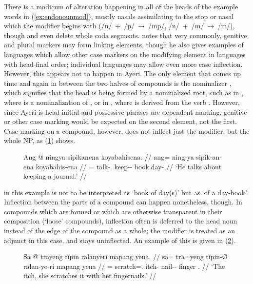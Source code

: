 There is a modicum of alteration happening in all of the heads of the example 
words in (\ref{ex:endonounmod}), mostly nasals assimilating to the stop or 
nasal which the modifier begins with (/n/~+~/p/~→~/mp/, /n/~+~/m/~→~/m/), 
though  and  even delete 
whole coda segments.
\citet[703]{bauer2001} notes that very commonly, genitive and plural markers 
may form linking elements, though he also gives examples of languages which
allow other case markers on the modifying element in languages with head-final
order; individual languages may allow even more case inflection. However, this
appears not to happen in Ayeri. The only element that comes up time and again
in between the two halves of compounds is the nominalizer ,
which signifies that the head is being formed by a nominalized root, such as in
, where  is a 
nominalization of , or in 
, where  is derived 
from the verb . However, since Ayeri is head-initial
and possessive phrases are dependent marking, genitive or other case marking
would be expected on the second element, not the first. Case marking on a
compound, however, does not inflect just the modifier, but the whole NP, as 
(\ref{ex:compinfl}) shows.

\begin{figure}[h]
\ex\label{ex:compinfl}\begingl
	\gla Ang @ ningya sipikanena koyabahisena. //
	\glb ang= ning-ya sipik-an-ena koyabahis-ena //
	\glc \AgtT{}= talk-\TsgM{}.\Top{} keep-\Nmlz{}-\Gen{} book.day-\Gen{} //
	\glft `He talks about keeping a journal.' //
\endgl\xe
\end{figure}

 in this example is not to be interpreted as 
`book of day(s)' but as `of a day-book'. Inflection between the parts of a
compound can happen nonetheless, though. In compounds which are formed  or which are otherwise transparent in their composition (`loose'
compounds\label{loosecomp}), inflection often is deferred to the head noun
instead of the edge of the compound as a whole; the modifier is treated as an
adjunct in this case, and stays uninflected. An example of this is given in 
(\ref{ex:nouncompdiv}).

\begin{figure}[h]
\ex\label{ex:nouncompdiv}\begingl
	\gla Sa @ trayeng tipin ralanyeri mapang yena. //
	\glb sa= tra=yeng tipin-Ø ralan-ye-ri mapang yena //
	\glc \PatT{}= scratch=\TsgF{}.\Aarg{} itch-\Top{} nail-\Pl{}-\Ins{} 
		finger \TsgF{}.\Gen{} //
	\glft `The itch, she scratches it with her fingernails.' //
\endgl\xe
\end{figure}

